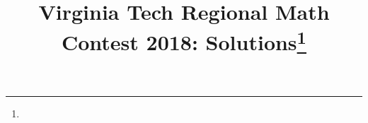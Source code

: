 \documentclass[10pt]{article}
\begin{document}
\title{Virginia Tech Regional Math Contest 2018: Solutions\footnote{\disclaimer}}
\author{\vspace{-2ex}}
\date{\vspace{-5ex}} %
\maketitle

%

%

%

%

%

%

%
\end{document}

